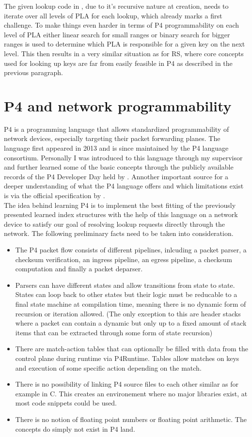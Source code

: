 The given lookup code in \cite{pgm}, due to it's recursive nature at creation, needs to iterate over all levels of PLA for each lookup, which already marks a first challenge. To make things even harder in terms of P4 programmability on each level of PLA either linear search for small ranges or binary search for bigger ranges is used to determine which PLA is responsible for a given key on the next level. This then results in a very similar situation as for RS, where core concepts used for looking up keys are far from easily feasible in P4 as described in the previous paragraph.

\section{P4 and network programmability}
P4 is a programming language that allows standardized programmability of network devices, especially targeting their packet forwarding planes. The language first appeared in 2013 and is since maintained by the P4 language consortium. Personally I was introduced to this language through my supervisor and further learned some of the basic concepts through the publicly available records of the P4 Developer Day held by \cite{p4-devday}. Annother important source for a deeper understanding of what the P4 language offers and which limitations exist is via the official specification by \cite{p4-spec}.\\
The idea behind learning P4 is to implement the best fitting of the previously presented learned index structures with the help of this language on a network device to satisfy our goal of resolving lookup requests directly through the network. The following preliminary facts need to be taken into consideration.

\begin{itemize}
  \item The P4 packet flow consists of different pipelines, inlcuding a packet parser, a checksum verification, an ingress pipeline, an egress pipeline, a checksum computation and finally a packet deparser.
  \item Parsers can have different states and allow transitions from state to state. States can loop back to other states but their logic must be reducable to a final state machine at compilation time, meaning there is no dynamic form of recursion or iteration allowed. (The only exception to this are header stacks where a packet can contain a dynamic but only up to a fixed amount of stack items that can be extracted through some form of state recursion)
  \item There are match-action tables that can optionally be filled with data from the control plane during runtime via P4Runtime. Tables allow matches on keys and execution of some specific action depending on the match.
  \item There is no possibility of linking P4 source files to each other similar as for example in C. This creates an environement where no major libraries exist, at most code snippets could be used.
  \item There is no notion of floating point numbers or floating point arithmetic. The concepts do simply not exist in P4 land.
\end{itemize}

